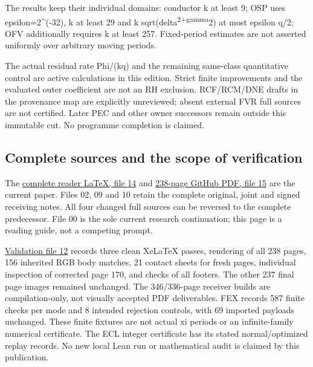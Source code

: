 \documentclass[
]{article}
\begin{document}
The results keep their individual domains: conductor k at least 9; OSP
uses epsilon=2\^{}(-32), k at least 29 and k
sqrt(delta\textsuperscript{2+gamma}2) at most epsilon q/2; OFV
additionally requires k at least 257. Fixed-period estimates are not
asserted uniformly over arbitrary moving periods.

The actual residual rate Phi/(kq) and the remaining same-class
quantitative control are active calculations in this edition. Strict
finite improvements and the evaluated outer coefficient are not an RH
exclusion. RCF/RCM/DNE drafts in the provenance map are explicitly
unreviewed; absent external FVR full sources are not certified. Later
PEC and other owner successors remain outside this immutable cut. No
programme completion is claimed.

\subsection{Complete sources and the scope of
verification}\label{complete-sources-and-the-scope-of-verification}

The
\href{https://github.com/KokunoYumeto/zeta-function-research-reader/blob/36b2654e1d3324c6de24e324ec34bb3a98f67103/workbenches/splitzero-tandem/continuations/20260915-operator-control-continuation/14_CURRENT_KERNEL_AND_MULTIPLICITY_PROOFS.tex}{complete
reader LaTeX, file 14} and
\href{https://github.com/KokunoYumeto/zeta-function-research-reader/blob/36b2654e1d3324c6de24e324ec34bb3a98f67103/workbenches/splitzero-tandem/continuations/20260915-operator-control-continuation/15_CURRENT_MIXED_CONTROL_READER.pdf}{238-page
GitHub PDF, file 15} are the current paper. Files 02, 09 and 10 retain
the complete original, joint and signed receiving notes. All four
changed full sources can be reversed to the complete predecessor. File
00 is the sole current research continuation; this page is a reading
guide, not a competing prompt.

\href{https://github.com/KokunoYumeto/zeta-function-research-reader/blob/36b2654e1d3324c6de24e324ec34bb3a98f67103/workbenches/splitzero-tandem/continuations/20260915-operator-control-continuation/12_VALIDATION.md}{Validation
file 12} records three clean XeLaTeX passes, rendering of all 238 pages,
156 inherited RGB body matches, 21 contact sheets for fresh pages,
individual inspection of corrected page 170, and checks of all footers.
The other 237 final page images remained unchanged. The 346/336-page
receiver builds are compilation-only, not visually accepted PDF
deliverables. FEX records 587 finite checks per mode and 8 intended
rejection controls, with 69 imported payloads unchanged. These finite
fixtures are not actual xi periods or an infinite-family numerical
certificate. The ECL integer certificate has its stated normal/optimized
replay records. No new local Lean run or mathematical audit is claimed
by this publication.
\end{document}
